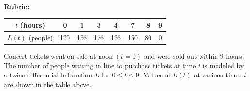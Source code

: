 \documentclass[12pt,addpoints,answers]{exam}
\begin{document}
\begin{questions}
\begin{solution}
\par\medskip
\textbf{Rubric:}\par
{}
\end{solution}

\question
\begin{center}
\begin{tabular}{|c||c|c|c|c|c|c|c|}
\hline
$t$ (hours) & 0 & 1 & 3 & 4 & 7 & 8 & 9 \\
\hline
$L(t)$ (people) & 120 & 156 & 176 & 126 & 150 & 80 & 0 \\
\hline
\end{tabular}
\end{center}
Concert tickets went on sale at noon $(t=0)$ and were sold out within 9 hours. The number of people waiting in line to purchase tickets at time $t$ is modeled by a twice-differentiable function $L$ for $0 \leq t \leq 9$. Values of $L(t)$ at various times $t$ are shown in the table above.\\
\begin{parts}

\end{parts}
\end{questions}
\end{document}
